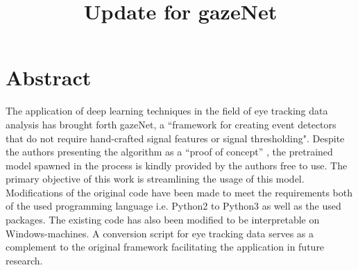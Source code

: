 \documentclass[conference]{IEEEtran}
\begin{document}
\title{Update for gazeNet\\
}

\author{
\and
{}
\and
{}
}

\maketitle
\section{Abstract}
The application of deep learning techniques in the field of eye tracking data analysis has brought forth gazeNet, a ``framework for creating event detectors that do not require hand-crafted signal
features or signal thresholding". \citet{zemblys2018gazeNet} Despite the authors presenting the algorithm as a ``proof of concept'' \citet{zemblys2018gazeNet}, the pretrained model spawned in the process is kindly provided by the authors free to use. The primary objective of this work is streamlining the usage of this model. Modifications of the original code have been made to meet the requirements both of the used programming language i.e. Python2 to Python3 as well as the used packages. The existing code has also been modified to be interpretable on Windows-machines. A conversion script for eye tracking data serves as a complement to the original framework facilitating the application in future research.
\end{document}
